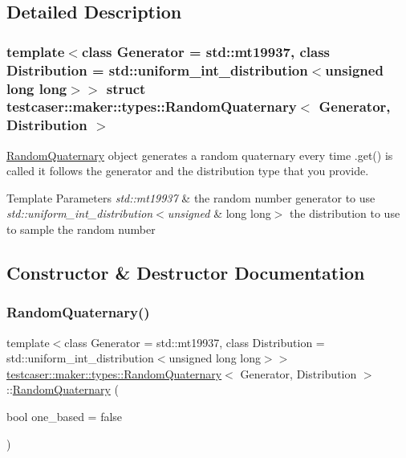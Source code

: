 \subsection{Detailed Description}
\subsubsection*{template$<$class Generator = std\+::mt19937, class Distribution = std\+::uniform\+\_\+int\+\_\+distribution$<$unsigned long long$>$$>$\newline
struct testcaser\+::maker\+::types\+::\+Random\+Quaternary$<$ Generator, Distribution $>$}

\hyperlink{structtestcaser_1_1maker_1_1types_1_1RandomQuaternary}{Random\+Quaternary} object generates a random quaternary every time .get() is called it follows the generator and the distribution type that you provide. 


\begin{DoxyTemplParams}{Template Parameters}
{\em std\+::mt19937} & the random number generator to use \\
\hline
{\em std\+::uniform\+\_\+int\+\_\+distribution$<$unsigned} & long long$>$ the distribution to use to sample the random number \\
\hline
\end{DoxyTemplParams}


\subsection{Constructor \& Destructor Documentation}
\mbox{\label{structtestcaser_1_1maker_1_1types_1_1RandomQuaternary_a8d299dc157ab77fd89f5aba347e2e806}} 
\subsubsection{\texorpdfstring{Random\+Quaternary()}{RandomQuaternary()}}
{\footnotesize\ttfamily template$<$class Generator = std\+::mt19937, class Distribution = std\+::uniform\+\_\+int\+\_\+distribution$<$unsigned long long$>$$>$ \\
\hyperlink{structtestcaser_1_1maker_1_1types_1_1RandomQuaternary}{testcaser\+::maker\+::types\+::\+Random\+Quaternary}$<$ Generator, Distribution $>$\+::\hyperlink{structtestcaser_1_1maker_1_1types_1_1RandomQuaternary}{Random\+Quaternary} (\begin{DoxyParamCaption}\item[{bool}]{one\+\_\+based = {\ttfamily false} }\end{DoxyParamCaption})\hspace{0.3cm}{\ttfamily [inline]}}




